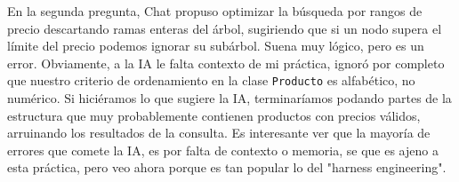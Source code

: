 \documentclass[12pt, letterpaper]{article}
\begin{document}
En la segunda pregunta, Chat propuso optimizar la búsqueda por rangos de precio descartando ramas enteras del árbol, sugiriendo que si un nodo supera el límite del precio podemos ignorar su subárbol. Suena muy lógico, pero es un error. Obviamente, a la IA le falta contexto de mi práctica, ignoró por completo que nuestro criterio de ordenamiento en la clase \texttt{Producto} es alfabético, no numérico. Si hiciéramos lo que sugiere la IA, terminaríamos podando partes de la estructura que muy probablemente contienen productos con precios válidos, arruinando los resultados de la consulta. Es interesante ver que la mayoría de errores que comete la IA, es por falta de contexto o memoria, se que es ajeno a esta práctica, pero veo ahora porque es tan popular lo del "harness engineering".
\end{document}
